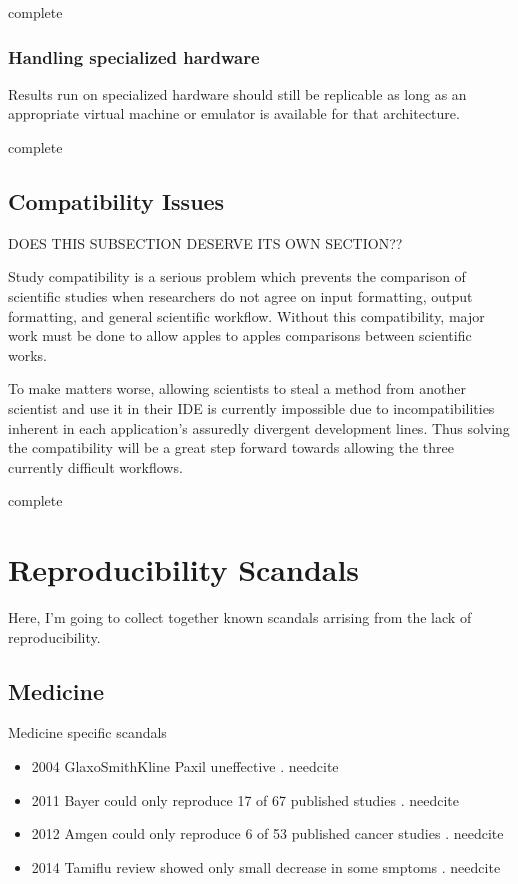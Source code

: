 \documentclass{article}
\newcommand{\complete}{
	\gls{complete}
}
\newcommand{\needcite}{
	\gls{needcite}
}
\begin{document}
\complete

\subsubsection{Handling specialized hardware}

Results run on specialized hardware should still be replicable as long as an appropriate virtual machine or emulator is available for that architecture.

\complete

\subsection{Compatibility Issues}

DOES THIS SUBSECTION DESERVE ITS OWN SECTION??

Study compatibility is a serious problem which prevents the comparison of scientific studies when researchers do not agree on input formatting, output formatting, and general scientific workflow. Without this compatibility, major work must be done to allow apples to apples comparisons between scientific works.

To make matters worse, allowing scientists to steal a method from another scientist and use it in their IDE is currently impossible due to incompatibilities inherent in each application's assuredly divergent development lines. Thus solving the compatibility will be a great step forward towards allowing the three currently difficult workflows.

\complete

\section{Reproducibility Scandals}

Here, I'm going to collect together known scandals arrising from the lack of reproducibility.

\subsection{Medicine}

Medicine specific scandals

\begin{itemize}
\item 2004 GlaxoSmithKline Paxil uneffective \cite{dhb-zurich-hp}. \needcite
\item 2011 Bayer could only reproduce 17 of 67 published studies \cite{dhb-zurich-hp}. \needcite
\item 2012 Amgen could only reproduce 6 of 53 published cancer studies \cite{dhb-zurich-hp}. \needcite
\item 2014 Tamiflu review showed only small decrease in some smptoms \cite{dhb-zurich-hp}. \needcite
\end{itemize}
\end{document}
